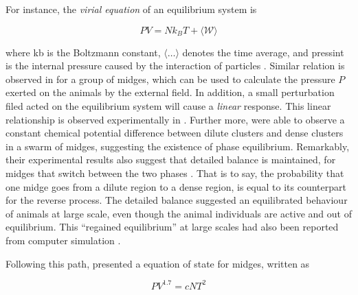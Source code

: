 \documentclass[11pt,twoside]{report}
\begin{document}
For instance, the \emph{virial equation} of an equilibrium system is

\begin{equation}
	 PV = Nk_BT + \langle \mathcal{W} \rangle
\label{eq:virial}
\end{equation}

\noindent where \gls{kb} is the Boltzmann constant, $\langle \dots \rangle$ denotes the time average, and \gls{pressint} is the internal pressure caused by the interaction of particles \cite{hansen2013ch2, allen2017}. Similar relation is observed in \cite{gorbonos2016} for a group of midges, which can be used to calculate the pressure $P$ exerted on the animals by the external field.
In addition, a small perturbation filed acted on the equilibrium system will cause a \emph{linear} response. This linear relationship is observed experimentally in \cite{ni2015prl}.
Further more, \citeauthor{sinhuber2017} were able to observe a constant chemical potential difference between dilute clusters and dense clusters in a swarm of midges, suggesting the existence of phase equilibrium.
Remarkably, their experimental results also suggest that detailed balance is maintained, for midges that switch between the two phases \cite{sinhuber2017}.
That is to say, the probability that one midge goes from a dilute region to a dense region, is equal to its counterpart for the reverse process. The detailed balance suggested an equilibrated behaviour of animals at large scale, even though the animal individuals are active and out of equilibrium. This ``regained equilibrium'' at large scales had also been reported from computer simulation \cite{egolf2000}.

Following this path, \citeauthor{sinhuber2021} presented a equation of state for midges, written as

\begin{equation}
	PV^{1.7} = c N T^2
\label{eq:eos-midge}
\end{equation}
\end{document}
